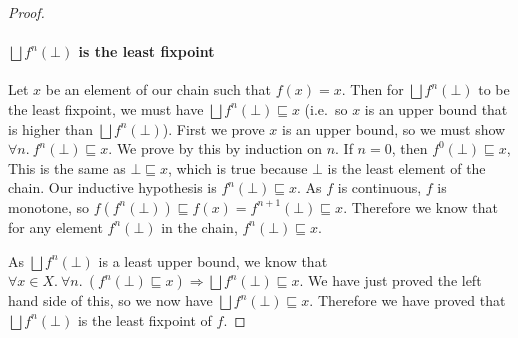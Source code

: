 \begin{proof}
\paragraph{$\bigsqcup f^n (\bot)$ is the least fixpoint}
Let $x$ be an element of our chain such that $f(x) = x$. Then for $\bigsqcup f^n (\bot)$ to be the least fixpoint, we must have $\bigsqcup f^n (\bot) \sqsubseteq x$ (i.e.\ so $x$ is an upper bound that is higher than $\bigsqcup f^n (\bot)$). First we prove $x$ is an upper bound, so  we must show $\forall n. \ f^n(\bot) \sqsubseteq x$. We prove by this by induction on $n$. If $n = 0$, then $f^0(\bot) \sqsubseteq x$, This is the same as $\bot \sqsubseteq x$, which is true because $\bot$ is the least element of the chain. Our inductive hypothesis is $f^n(\bot) \sqsubseteq x$. As $f$ is continuous, $f$ is monotone, so $f(f^n(\bot)) \sqsubseteq f(x) = f^{n+1}(\bot) \sqsubseteq x$. Therefore we know that for any element $f^n(\bot)$ in the chain, $f^n(\bot) \sqsubseteq x$. 

As $\bigsqcup f^n (\bot)$ is a least upper bound, we know that  $\forall x \in X. \  \forall n. \ (f^n(\bot) \sqsubseteq x) \Rightarrow \bigsqcup f^n (\bot) \sqsubseteq x$. We have just proved the left hand side of this, so we now have $\bigsqcup f^n (\bot) \sqsubseteq x$. Therefore we have proved that $\bigsqcup f^n (\bot)$ is the least fixpoint of $f$.
\end{proof}